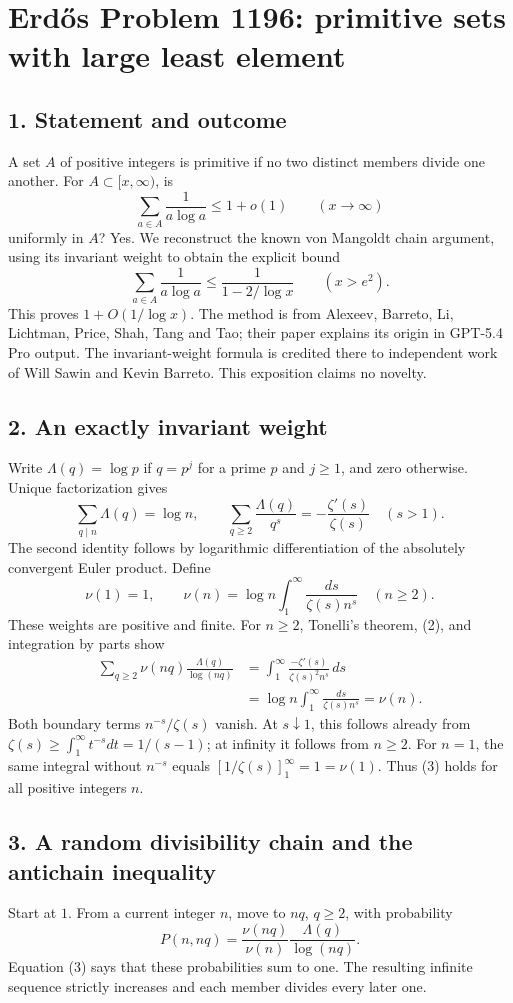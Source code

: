 \section*{Erd\H{o}s Problem 1196: primitive sets with large least element}
\subsection*{1. Statement and outcome}
A set $A$ of positive integers is primitive if no two distinct members divide one another. For $A\subset[x,\infty)$, is
\[
 \sum_{a\in A}\frac1{a\log a}\le1+o(1)\qquad(x\to\infty)
\]
uniformly in $A$? Yes. We reconstruct the known von Mangoldt chain argument, using its invariant weight to obtain the explicit bound
\[
 \sum_{a\in A}\frac1{a\log a}\le\frac1{1-2/\log x}\qquad(x>e^2). \tag{1}
\]
This proves $1+O(1/\log x)$. The method is from Alexeev, Barreto, Li, Lichtman, Price, Shah, Tang and Tao; their paper explains its origin in GPT-5.4 Pro output. The invariant-weight formula is credited there to independent work of Will Sawin and Kevin Barreto. This exposition claims no novelty.

\subsection*{2. An exactly invariant weight}
Write $\Lambda(q)=\log p$ if $q=p^j$ for a prime $p$ and $j\ge1$, and zero otherwise. Unique factorization gives
\[
 \sum_{q\mid n}\Lambda(q)=\log n,\qquad
 \sum_{q\ge2}\frac{\Lambda(q)}{q^s}=-\frac{\zeta'(s)}{\zeta(s)}\quad(s>1). \tag{2}
\]
The second identity follows by logarithmic differentiation of the absolutely convergent Euler product. Define
\[
 \nu(1)=1,\qquad
 \nu(n)=\log n\int_1^\infty\frac{ds}{\zeta(s)n^s}\quad(n\ge2).
\]
These weights are positive and finite. For $n\ge2$, Tonelli's theorem, (2), and integration by parts show
\[
 \begin{split}
 \sum_{q\ge2}\nu(nq)\frac{\Lambda(q)}{\log(nq)}
 &=\int_1^\infty\frac{-\zeta'(s)}{\zeta(s)^2n^s}\,ds\\
 &=\log n\int_1^\infty\frac{ds}{\zeta(s)n^s}=\nu(n). \tag{3}
 \end{split}
\]
Both boundary terms $n^{-s}/\zeta(s)$ vanish. At $s\downarrow1$, this follows already from $\zeta(s)\ge\int_1^\infty t^{-s}dt=1/(s-1)$; at infinity it follows from $n\ge2$. For $n=1$, the same integral without $n^{-s}$ equals $[1/\zeta(s)]_1^\infty=1=\nu(1)$. Thus (3) holds for all positive integers $n$.

\subsection*{3. A random divisibility chain and the antichain inequality}
Start at $1$. From a current integer $n$, move to $nq$, $q\ge2$, with probability
\[
 P(n,nq)=\frac{\nu(nq)}{\nu(n)}\frac{\Lambda(q)}{\log(nq)}.
\]
Equation (3) says that these probabilities sum to one. The resulting infinite sequence strictly increases and each member divides every later one.

